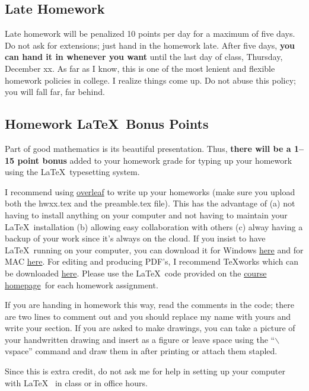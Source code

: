 \documentclass[12pt]{article}
\newcommand{\ingreen}[1]{\color{green}\textbf{#1} \color{black}}
\newcommand{\coursewebpage}{\href{https://github.com/kapelner/QC_Math_241_Fall_2015}{course homepage}}
\newcommand{\qu}[1]{``#1''}
\begin{document}
\subsection*{Late Homework}

Late homework will be penalized 10 points per day for a maximum of five days. Do not ask for extensions; just hand in the homework late. After five days, \textbf{you can hand it in whenever you want} until the last day of class, Thursday, December xx. As far as I know, this is one of the most lenient and flexible homework policies in college. I realize things come up. Do not abuse this policy; you will fall far, far behind.

\subsection*{Homework \LaTeX~Bonus Points}

Part of good mathematics is its beautiful presentation. Thus, \ingreen{there will be a 1--15 point bonus} added to your homework grade  for typing up your homework using the \LaTeX ~typesetting system. 

I recommend using \href{http://overleaf.com}{overleaf} to write up your homeworks (make sure you upload both the hwxx.tex and the preamble.tex file). This has the advantage of (a) not having to install anything on your computer and not having to maintain your \LaTeX ~installation (b) allowing easy collaboration with others (c) alway having a backup of your work since it's always on the cloud. If you insist to have \LaTeX ~running on your computer, you can download it for Windows \href{http://www.miktex.org/download}{here} and for MAC \href{http://www.tug.org/mactex/}{here}. For editing and producing PDF's, I recommend \TeX works which can be downloaded \href{http://www.tug.org/texworks/#Getting_TeXworks}{here}. Please use the \LaTeX ~code provided on the \coursewebpage ~for each homework assignment. 

If you are handing in homework this way, read the comments in the code; there are two lines to comment out and you should replace my name with yours and write your section. If you are asked to make drawings, you can take a picture of your handwritten drawing and insert as a figure or leave space using the \qu{$\backslash$vspace} command and draw them in after printing or attach them stapled.

Since this is extra credit, do not ask me for help in setting up your computer with \LaTeX~ in class or in office hours.
\end{document}
